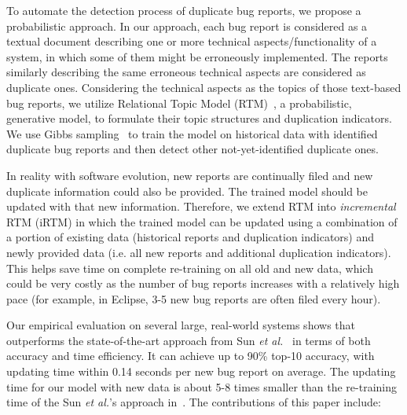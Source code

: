 

To automate the detection process of duplicate bug reports, we propose
a probabilistic approach. In our approach, each bug report is
considered as a textual document describing one or more technical
aspects/functionality of a system, in which some of them might be
erroneously implemented. The reports similarly describing the same
erroneous technical aspects are considered as duplicate
ones. Considering the technical aspects as the topics of those
text-based bug reports, we utilize Relational Topic Model
(RTM)~\cite{RTM}, a probabilistic, generative model, to formulate
their topic structures and duplication indicators. We use Gibbs
sampling~\cite{gibb} to train the model on historical data with
identified duplicate bug reports and then detect other
not-yet-identified duplicate ones.


In reality with software evolution, new reports are continually filed
and new duplicate information could also be provided. The trained
model should be updated with that new information. Therefore, we
extend RTM into {\em incremental} RTM (iRTM) in which the trained
model can be updated using a combination of a portion of existing data
(historical reports and duplication indicators) and newly provided
data (i.e. all new reports and additional duplication
indicators). This helps save time on complete re-training on all old
and new data, which could be very costly as the number of bug reports
increases with a relatively high pace (for example, in Eclipse, 3-5
new bug reports are often filed every hour).


Our empirical evaluation on several large, real-world systems shows
that {\model} outperforms the state-of-the-art approach from Sun {\em
et al.}~\cite{davidlo10} in terms of both accuracy and time
efficiency. It can achieve up to 90\% top-10 accuracy, with updating
time within 0.14 seconds per new bug report on average. The updating
time for our model with new data is about 5-8 times smaller than the
re-training time of the Sun {\em et al.}'s approach
in~\cite{davidlo10}. The contributions of this paper include:

